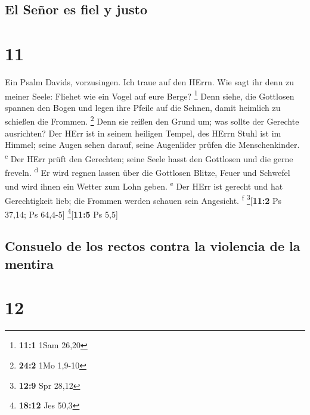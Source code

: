 \hypertarget{el-seuxf1or-es-fiel-y-justo}{%
\subsection{El Señor es fiel y
justo}\label{el-seuxf1or-es-fiel-y-justo}}

\hypertarget{section-10}{%
\section{11}\label{section-10}}

 Ein Psalm Davids, vorzusingen. Ich traue auf den HErrn.
Wie sagt ihr denn zu meiner Seele: Fliehet wie ein Vogel auf eure Berge?
\footnote{\textbf{11:1} 1Sam 26,20}  Denn siehe, die
Gottlosen spannen den Bogen und legen ihre Pfeile auf die Sehnen, damit
heimlich zu schießen die Frommen. \footnote{\textbf{24:2} 1Mo 1,9-10}
 Denn sie reißen den Grund um; was sollte der Gerechte
ausrichten?  Der HErr ist in seinem heiligen Tempel, des
HErrn Stuhl ist im Himmel; seine Augen sehen darauf, seine Augenlider
prüfen die Menschenkinder. \textsuperscript{c}  Der HErr
prüft den Gerechten; seine Seele hasst den Gottlosen und die gerne
freveln. \textsuperscript{d}  Er wird regnen lassen über
die Gottlosen Blitze, Feuer und Schwefel und wird ihnen ein Wetter zum
Lohn geben. \textsuperscript{e}  Der HErr ist gerecht und
hat Gerechtigkeit lieb; die Frommen werden schauen sein Angesicht.
\textsuperscript{f} \footnote{\textbf{12:9} Spr 28,12}{[}\textbf{11:2}
Ps 37,14; Ps 64,4-5{]} \footnote{\textbf{18:12} Jes 50,3}{[}\textbf{11:5}
Ps 5,5{]}

\hypertarget{consuelo-de-los-rectos-contra-la-violencia-de-la-mentira}{%
\subsection{Consuelo de los rectos contra la violencia de la
mentira}\label{consuelo-de-los-rectos-contra-la-violencia-de-la-mentira}}

\hypertarget{section-11}{%
\section{12}\label{section-11}}

